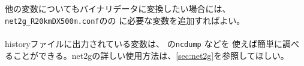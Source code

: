 他の変数についてもバイナリデータに変換したい場合には、
\verb|net2g_R20kmDX500m.conf|のの に必要な変数を追加すればよい。\\

\\

\noindent
historyファイルに出力されている変数は、{\netcdf} の\verb|ncdump| などを
使えば簡単に調べることができる。net2gの詳しい使用方法は、\ref{sec:net2g}を参照してほしい。




